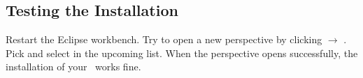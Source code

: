 \subsection{Testing the Installation} 
Restart the Eclipse workbench. Try to open a new perspective by clicking  $\rightarrow$ . Pick  and select  in the upcoming list.
When the perspective opens successfully, the installation of your \cjdt ~works fine.
